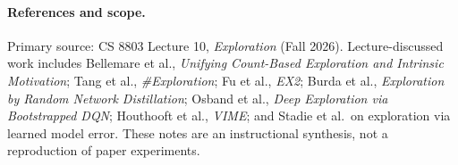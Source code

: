 \paragraph{References and scope.}
Primary source: CS 8803 Lecture 10, \emph{Exploration} (Fall 2026). Lecture-discussed work includes Bellemare et al., \emph{Unifying Count-Based Exploration and Intrinsic Motivation}; Tang et al., \emph{\#Exploration}; Fu et al., \emph{EX2}; Burda et al., \emph{Exploration by Random Network Distillation}; Osband et al., \emph{Deep Exploration via Bootstrapped DQN}; Houthooft et al., \emph{VIME}; and Stadie et al.\ on exploration via learned model error. These notes are an instructional synthesis, not a reproduction of paper experiments.

